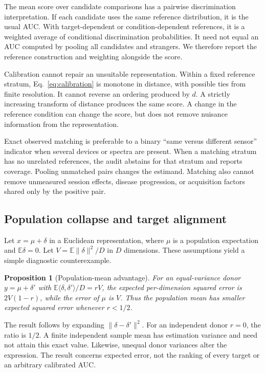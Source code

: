 \documentclass[10pt,twocolumn,letterpaper]{article}
\newtheorem{proposition}{Proposition}
\newcommand{\E}{\mathbb{E}}
\begin{document}
The mean score over candidate comparisons has a pairwise discrimination interpretation. If each candidate uses the same reference distribution, it is the usual AUC. With target-dependent or condition-dependent references, it is a weighted average of conditional discrimination probabilities. It need not equal an AUC computed by pooling all candidates and strangers. We therefore report the reference construction and weighting alongside the score.

Calibration cannot repair an unsuitable representation. Within a fixed reference stratum, Eq.~\ref{eq:calibration} is monotone in distance, with possible ties from finite resolution. It cannot reverse an ordering produced by $d$. A strictly increasing transform of distance produces the same score. A change in the reference condition can change the score, but does not remove nuisance information from the representation.

Exact observed matching is preferable to a binary ``same versus different sensor'' indicator when several devices or spectra are present. When a matching stratum has no unrelated references, the audit abstains for that stratum and reports coverage. Pooling unmatched pairs changes the estimand. Matching also cannot remove unmeasured session effects, disease progression, or acquisition factors shared only by the positive pair.

\subsection{Population collapse and target alignment}
Let $x=\mu+\delta$ in a Euclidean representation, where $\mu$ is a population expectation and $\E\delta=0$. Let $V=\E\|\delta\|^2/D$ in $D$ dimensions. These assumptions yield a simple diagnostic counterexample.

\begin{proposition}[Population-mean advantage]
For an equal-variance donor $y=\mu+\delta'$ with $\E\langle\delta,\delta'\rangle/D=rV$, the expected per-dimension squared error is $2V(1-r)$, while the error of $\mu$ is $V$. Thus the population mean has smaller expected squared error whenever $r<1/2$.
\end{proposition}
\noindent The result follows by expanding $\|\delta-\delta'\|^2$. For an independent donor $r=0$, the ratio is $1/2$. A finite independent sample mean has estimation variance and need not attain this exact value. Likewise, unequal donor variances alter the expression. The result concerns expected error, not the ranking of every target or an arbitrary calibrated AUC.
\end{document}
